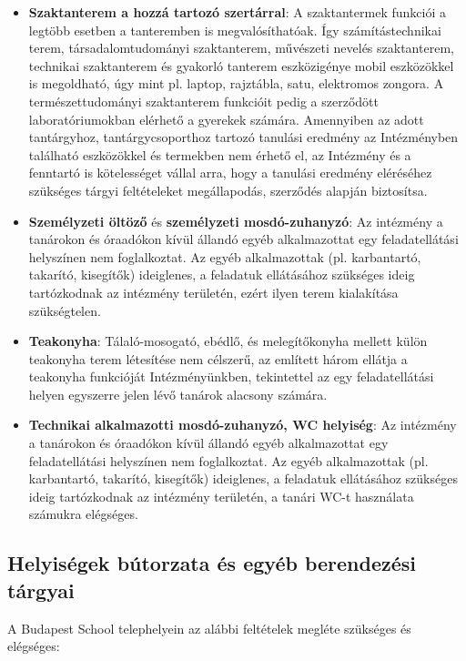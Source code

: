 \begin{itemize}
\item
  \textbf{Szaktanterem a hozzá tartozó szertárral}: A szaktantermek
  funkciói a legtöbb esetben a tanteremben is megvalósíthatóak. Így
  számítástechnikai terem, társadalomtudományi szaktanterem, művészeti
  nevelés szaktanterem, technikai szaktanterem és gyakorló tanterem
  eszközigénye mobil eszközökkel is megoldható, úgy mint pl. laptop,
  rajztábla, satu, elektromos zongora. A természettudományi szaktanterem
  funkcióit pedig a szerződött laboratóriumokban elérhető a gyerekek
  számára. Amennyiben az adott tantárgyhoz, tantárgycsoporthoz tartozó
  tanulási eredmény az Intézményben található eszközökkel és termekben
  nem érhető el, az Intézmény és a fenntartó is kötelességet vállal
  arra, hogy a tanulási eredmény eléréséhez szükséges tárgyi
  feltételeket megállapodás, szerződés alapján biztosítsa.
\item
  \textbf{Személyzeti öltöző} és \textbf{személyzeti mosdó-zuhanyzó}: Az
  intézmény a tanárokon és óraadókon kívül állandó egyéb alkalmazottat
  egy feladatellátási helyszínen nem foglalkoztat. Az egyéb
  alkalmazottak (pl. karbantartó, takarító, kisegítők) ideiglenes, a
  feladatuk ellátásához szükséges ideig tartózkodnak az intézmény
  területén, ezért ilyen terem kialakítása szükségtelen.
\item
  \textbf{Teakonyha}: Tálaló-mosogató, ebédlő, és melegítőkonyha mellett
  külön teakonyha terem létesítése nem célszerű, az említett három
  ellátja a teakonyha funkcióját Intézményünkben, tekintettel az egy
  feladatellátási helyen egyszerre jelen lévő tanárok alacsony számára.
\item
  \textbf{Technikai alkalmazotti mosdó-zuhanyzó, WC helyiség}: Az
  intézmény a tanárokon és óraadókon kívül állandó egyéb alkalmazottat
  egy feladatellátási helyszínen nem foglalkoztat. Az egyéb
  alkalmazottak (pl. karbantartó, takarító, kisegítők) ideiglenes, a
  feladatuk ellátásához szükséges ideig tartózkodnak az intézmény
  területén, a tanári WC-t használata számukra elégséges.
\end{itemize}

\hypertarget{helyisegek-butorzata-es-egyeb-berendezesi-targyai}{%
\subsection{Helyiségek bútorzata és egyéb berendezési
tárgyai}\label{helyisegek-butorzata-es-egyeb-berendezesi-targyai}}

A Budapest School telephelyein az alábbi feltételek megléte szükséges és
elégséges:

